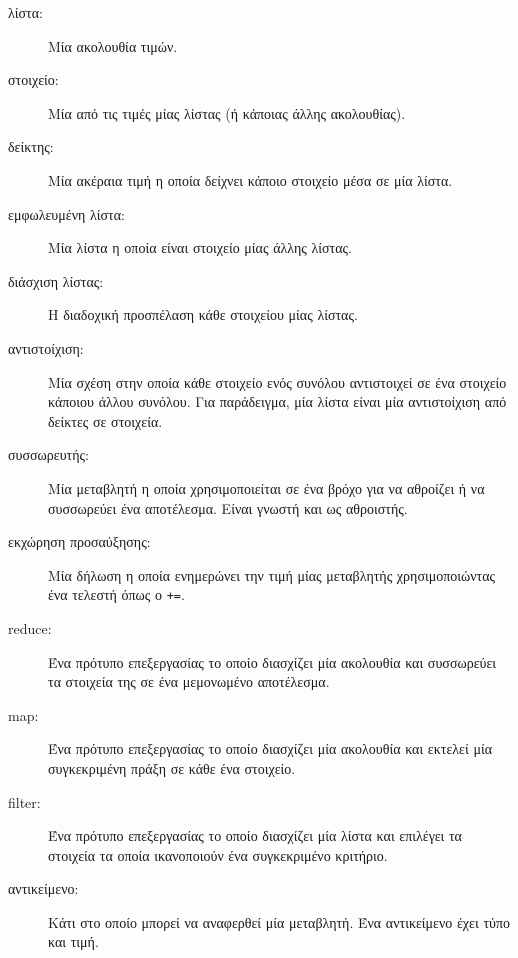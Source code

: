 \documentclass[10pt]{book}
\begin{document}
\begin{description}

\item[λίστα:] Μία ακολουθία τιμών.

\item[στοιχείο:] Μία από τις τιμές μίας λίστας (ή κάποιας άλλης ακολουθίας).

\item[δείκτης:] Μία ακέραια τιμή η οποία δείχνει κάποιο στοιχείο μέσα σε μία λίστα.

\item[εμφωλευμένη λίστα:] Μία λίστα η οποία είναι στοιχείο μίας άλλης λίστας.

\item[διάσχιση λίστας:] Η διαδοχική προσπέλαση κάθε στοιχείου μίας λίστας.

\item[αντιστοίχιση:] Μία σχέση στην οποία κάθε στοιχείο ενός συνόλου αντιστοιχεί σε ένα στοιχείο 
κάποιου άλλου συνόλου. Για παράδειγμα, μία λίστα είναι μία αντιστοίχιση από δείκτες σε στοιχεία.

\item[συσσωρευτής:] Μία μεταβλητή η οποία χρησιμοποιείται σε ένα βρόχο για να αθροίζει ή να συσσωρεύει ένα αποτέλεσμα. Είναι γνωστή και ως αθροιστής.

\item[εκχώρηση προσαύξησης:] Μία δήλωση η οποία ενημερώνει την τιμή μίας μεταβλητής χρησιμοποιώντας ένα τελεστή όπως ο \verb"+=".

\item[reduce:] Ένα πρότυπο επεξεργασίας το οποίο διασχίζει μία ακολουθία και συσσωρεύει τα στοιχεία της σε ένα μεμονωμένο αποτέλεσμα.
 
\item[map:] Ένα πρότυπο επεξεργασίας το οποίο διασχίζει μία ακολουθία και εκτελεί μία συγκεκριμένη πράξη σε κάθε ένα στοιχείο.

\item[filter:] Ένα πρότυπο επεξεργασίας το οποίο διασχίζει μία λίστα και επιλέγει τα στοιχεία τα οποία ικανοποιούν ένα συγκεκριμένο κριτήριο.

\item[αντικείμενο:] Κάτι στο οποίο μπορεί να αναφερθεί μία μεταβλητή. Ένα αντικείμενο έχει τύπο και τιμή.


\end{description}
\end{document}
